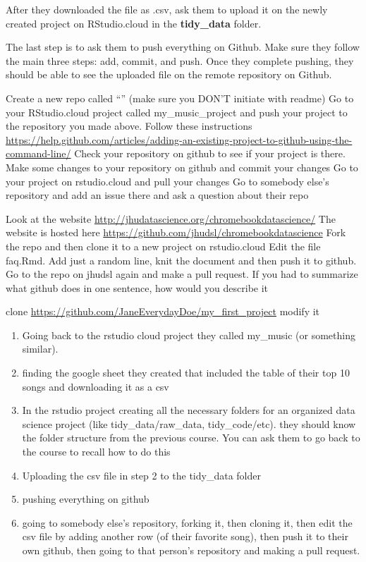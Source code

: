 \documentclass[]{book}
\begin{document}
After they downloaded the file as .csv, ask them to upload it on the newly created project on RStudio.cloud in the \textbf{tidy\_data} folder.

The last step is to ask them to push everything on Github. Make sure they follow the main three steps: add, commit, and push. Once they complete pushing, they should be able to see the uploaded file on the remote repository on Github.

Create a new repo called ``'' (make sure you DON'T initiate with readme)
Go to your RStudio.cloud project called my\_music\_project and push your project to the repository you made above. Follow these instructions \url{https://help.github.com/articles/adding-an-existing-project-to-github-using-the-command-line/}
Check your repository on github to see if your project is there.
Make some changes to your repository on github and commit your changes
Go to your project on rstudio.cloud and pull your changes
Go to somebody else's repository and add an issue there and ask a question about their repo

Look at the website \url{http://jhudatascience.org/chromebookdatascience/}
The website is hosted here \url{https://github.com/jhudsl/chromebookdatascience}
Fork the repo and then clone it to a new project on rstudio.cloud
Edit the file faq.Rmd. Add just a random line, knit the document and then push it to github.
Go to the repo on jhudsl again and make a pull request.
If you had to summarize what github does in one sentence, how would you describe it

clone \url{https://github.com/JaneEverydayDoe/my_first_project}
modify it

\begin{enumerate}
\def\labelenumi{\arabic{enumi}.}
\item
  Going back to the rstudio cloud project they called my\_music (or something similar).
\item
  finding the google sheet they created that included the table of their top 10 songs and downloading it as a csv
\item
  In the rstudio project creating all the necessary folders for an organized data science project (like tidy\_data/raw\_data, tidy\_code/etc). they should know the folder structure from the previous course. You can ask them to go back to the course to recall how to do this
\item
  Uploading the csv file in step 2 to the tidy\_data folder
\item
  pushing everything on github
\item
  going to somebody else's repository, forking it, then cloning it, then edit the csv file by adding another row (of their favorite song), then push it to their own github, then going to that person's repository and making a pull request.
\end{enumerate}
\end{document}
